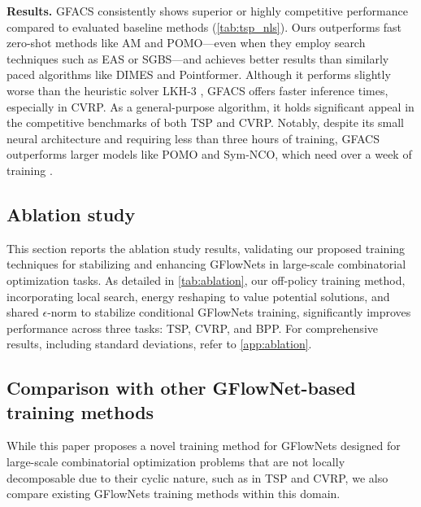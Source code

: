 \documentclass[twoside]{article}
\theoremstyle{plain}
\theoremstyle{definition}
\theoremstyle{remark}
\begin{document}
\textbf{Results.} GFACS consistently shows superior or highly competitive performance compared to evaluated baseline methods (\cref{tab:tsp_nls}). Ours outperforms fast zero-shot methods like AM and POMO—even when they employ search techniques such as EAS or SGBS—and achieves better results than similarly paced algorithms like DIMES and Pointformer. Although it performs slightly worse than the heuristic solver LKH-3 \citep{lkh2017}, GFACS offers faster inference times, especially in CVRP. As a general-purpose algorithm, it holds significant appeal in the competitive benchmarks of both TSP and CVRP. Notably, despite its small neural architecture and requiring less than three hours of training, GFACS outperforms larger models like POMO and Sym-NCO, which need over a week of training \citep{kim2022sym}.




\subsection{Ablation study} \label{sec:ablation}


\begin{table}[t]
    \centering
    \caption{Results of the ablation study.}
    \vspace{-0.5em}
    \resizebox{0.9\linewidth}{!}{} %
    \vspace{-0.5em}
    \label{tab:ablation}
\end{table}

This section reports the ablation study results, validating our proposed training techniques for stabilizing and enhancing GFlowNets in large-scale combinatorial optimization tasks. As detailed in \cref{tab:ablation}, our off-policy training method, incorporating local search, energy reshaping to value potential solutions, and shared $\epsilon$-norm to stabilize conditional GFlowNets training, significantly improves performance across three tasks: TSP, CVRP, and BPP. For comprehensive results, including standard deviations, refer to \cref{app:ablation}.

\subsection{Comparison with other GFlowNet-based training methods}
\label{sec:exp-fl-db}


While this paper proposes a novel training method for GFlowNets designed for large-scale combinatorial optimization problems that are not locally decomposable due to their cyclic nature, such as in TSP and CVRP, we also compare existing GFlowNets training methods within this domain.
\end{document}

